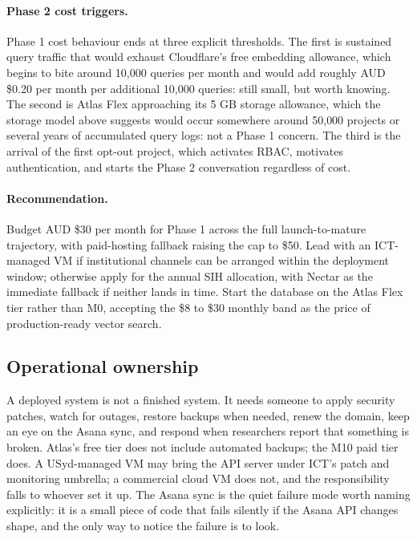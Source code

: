 \documentclass[11pt,a4paper]{article}
\begin{document}
\paragraph{Phase 2 cost triggers.} Phase 1 cost behaviour ends at three explicit thresholds. The first is sustained query traffic that would exhaust Cloudflare's free embedding allowance, which begins to bite around 10{,}000 queries per month and would add roughly AUD \$0.20 per month per additional 10{,}000 queries: still small, but worth knowing. The second is Atlas Flex approaching its 5 GB storage allowance, which the storage model above suggests would occur somewhere around 50{,}000 projects or several years of accumulated query logs: not a Phase 1 concern. The third is the arrival of the first opt-out project, which activates RBAC, motivates authentication, and starts the Phase 2 conversation regardless of cost.

\paragraph{Recommendation.} Budget AUD \$30 per month for Phase 1 across the full launch-to-mature trajectory, with paid-hosting fallback raising the cap to \$50. Lead with an ICT-managed VM if institutional channels can be arranged within the deployment window; otherwise apply for the annual SIH allocation, with Nectar as the immediate fallback if neither lands in time. Start the database on the Atlas Flex tier rather than M0, accepting the \$8 to \$30 monthly band as the price of production-ready vector search.

\subsection{Operational ownership}

A deployed system is not a finished system. It needs someone to apply security patches, watch for outages, restore backups when needed, renew the domain, keep an eye on the Asana sync, and respond when researchers report that something is broken. Atlas's free tier does not include automated backups; the M10 paid tier does. A USyd-managed VM may bring the API server under ICT's patch and monitoring umbrella; a commercial cloud VM does not, and the responsibility falls to whoever set it up. The Asana sync is the quiet failure mode worth naming explicitly: it is a small piece of code that fails silently if the Asana API changes shape, and the only way to notice the failure is to look.
\end{document}
